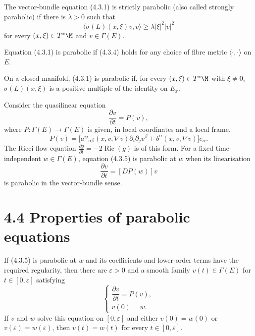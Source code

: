 The vector-bundle equation (4.3.1) is strictly parabolic (also called strongly
parabolic) if there is $\lambda>0$ such that
\[
\langle\sigma(L)(x,\xi)v,v\rangle
 \geq\lambda\lvert\xi\rvert^2\lvert v\rvert^2
\tag{4.3.4}
\]
for every $(x,\xi)\in T^*\M$ and $v\in\Gamma(E)$.

\begin{remark}
\label{topping-pde-vector-parabolic-fibre-metric}
Equation (4.3.1) is parabolic if (4.3.4) holds for any choice of fibre metric
$\langle\cdot,\cdot\rangle$ on $E$.
\end{remark}

\begin{remark}
\label{topping-pde-vector-parabolic-positive-multiple}
On a closed manifold, (4.3.1) is parabolic if, for every
$(x,\xi)\in T^*\M$ with $\xi\neq0$, $\sigma(L)(x,\xi)$ is a positive multiple
of the identity on $E_x$.
\end{remark}

Consider the quasilinear equation
\[
\frac{\partial v}{\partial t}=P(v),
\tag{4.3.5}
\]
where $P:\Gamma(E)\to\Gamma(E)$ is given, in local coordinates and a local frame,
\[
P(v)=\bigl[a^{ij}{}_{\alpha\beta}(x,v,\nabla v)\partial_i\partial_jv^\beta
 +b^\alpha(x,v,\nabla v)\bigr]e_\alpha.
\]
The Ricci flow equation $\frac{\partial g}{\partial t}=-2\operatorname{Ric}(g)$
is of this form. For a fixed time-independent $w\in\Gamma(E)$, equation
(4.3.5) is parabolic at $w$ when its linearisation
\[
\frac{\partial v}{\partial t}=[DP(w)]v
\]
is parabolic in the vector-bundle sense.

\section*{4.4 \quad Properties of parabolic equations}

If (4.3.5) is parabolic at $w$ and its coefficients and lower-order terms have
the required regularity, then there are $\varepsilon>0$ and a smooth family
$v(t)\in\Gamma(E)$ for $t\in[0,\varepsilon]$ satisfying
\[
\begin{cases}
\dfrac{\partial v}{\partial t}=P(v),\\
v(0)=w.
\end{cases}
\]
If $v$ and $w$ solve this equation on $[0,\varepsilon]$ and either
$v(0)=w(0)$ or $v(\varepsilon)=w(\varepsilon)$, then
$v(t)=w(t)$ for every $t\in[0,\varepsilon]$.
